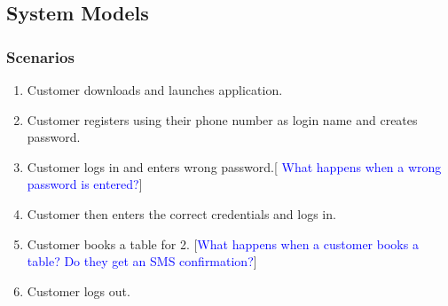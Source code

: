 \documentclass[15, notitlepage]{article}
\begin{document}
\subsection{System Models}
\subsubsection{Scenarios}
\begin{enumerate}
	\item Customer downloads and launches application.
	\item Customer registers using their phone number as login name and creates password.
	\item Customer logs in and enters wrong password.[\textcolor{blue}{ What happens when a wrong password is entered?}]
	\item Customer then enters the correct credentials and logs in.
	\item Customer books a table for 2. [\textcolor{blue}{What happens when a customer books a table? Do they get an SMS confirmation?}]
	\item Customer logs out.
\end{enumerate}
\end{document}
